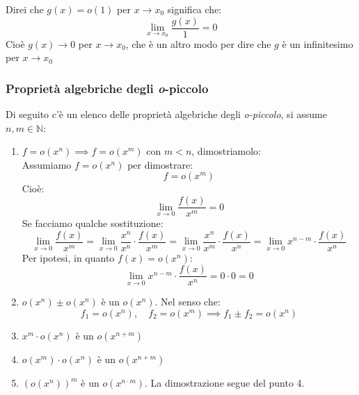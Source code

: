 Direi che $g(x) = o(1)$ per $x \to x_0$ significa che:
\begin{equation*}
	\lim_{x \to x_0} \dfrac{g(x)}{1} = 0
\end{equation*}
Cioè $g(x) \to 0$ per $x \to x_0$, che è un altro modo per dire che $g$ è un 
infinitesimo per $x \to x_0$

\subsubsection{Proprietà algebriche degli \textit{o}-piccolo}
Di seguito c'è un elenco delle proprietà algebriche degli \textit{o-piccolo}, 
si assume $n, m \in \mathbb{N}$:
\begin{enumerate}
	\item $f = o(x^n) \implies f= o(x^m)$ con $m < n$, dimostriamolo:\\

		Assumiamo $f = o(x^n)$ per dimostrare:
		\begin{equation*}
			f = o(x^m)
		\end{equation*}
		Cioè:
		\begin{equation*}
			\lim_{x \to 0} \dfrac{f(x)}{x^m} = 0
		\end{equation*}
		Se facciamo qualche sostituzione:
		\begin{equation*}
			\lim_{x \to 0} \dfrac{f(x)}{x^m} = \lim_{x \to 0} \dfrac{x^n}{x^n} 
            \cdot \dfrac{f(x)}{x^m} = \lim_{x \to 0} \dfrac{x^n}{x^m} \cdot 
            \dfrac{f(x)}{x^n} = \lim_{x \to 0} x^{n-m} \cdot \dfrac{f(x)}{x^n}
		\end{equation*}
		Per ipotesi, in quanto $f(x) = o(x^n)$:
		\begin{equation*}
			\lim_{x \to 0} x^{n-m} \cdot \dfrac{f(x)}{x^n} = 0 \cdot 0 = 0
		\end{equation*}

	\item $o(x^n) \pm o(x^n)$ è un $o(x^n)$. Nel senso che:
		\begin{equation*}
			f_1 = o(x^n), \quad f_2 = o(x^m) \implies f_1 \pm f_2 = o(x^n)
		\end{equation*}

	\item $x^m \cdot o(x^n)$ è un $o(x^{n+m})$

	\item $o(x^m) \cdot o(x^n)$ è un $o(x^{n+m})$

	\item $(o(x^n))^m$ è un $o(x^{n \cdot m})$. La dimostrazione segue del 
        punto 4.


\end{enumerate}
